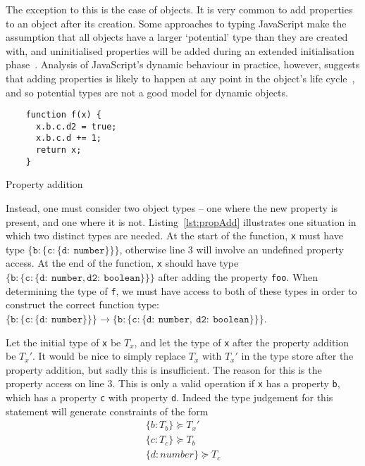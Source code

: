 \documentclass[12pt,a4paper,twoside,openright]{report}
\newcommand*{\js}{\texttt}
\begin{document}
The exception to this is the case of objects. It is very common to add
properties to an object after its creation. Some approaches to typing
JavaScript make the assumption that all objects have a larger `potential' type
than they are created with, and uninitialised properties will be added during
an extended initialisation phase~\cite{anderson05}. Analysis of JavaScript's
dynamic behaviour in practice, however, suggests that adding properties is
likely to happen at any point in the object's life cycle~\cite{JSBehaviour},
and so potential types are not a good model for dynamic objects.
\begin{program}[ht]
  \centering
  \begin{minipage}[b]{0.45\linewidth}
  	\begin{verbatim}
	function f(x) {
	  x.b.c.d2 = true;
	  x.b.c.d += 1;
	  return x;
	}	
  	\end{verbatim}
  	\vspace{23mm}
  \end{minipage}
  \quad
  \begin{minipage}[b]{0.45\linewidth}
  \end{minipage}
  \caption{Property addition}\label{lst:propAdd}
\end{program}

Instead, one must consider two object types -- one where the new property is
present, and one where it is not. Listing~\ref{lst:propAdd} illustrates one
situation in which two distinct types are needed. At the start of the function,
\js{x} must have type $\mathtt{\{b:\{c:\{d:\ number\}\}\}}$, otherwise line 3 will involve
an undefined property access. At the end of the function, \js{x} should
have type $\mathtt{\{b:\{c:\{d:\ number, d2:\ boolean\}\}\}}$ after adding the property
\js{foo}. When determining the type of \js{f}, we must have access to
both of these types in order to construct the correct function type:
$\mathtt{\{b:\{c:\{d:\ number\}\}\} \rightarrow \{b:\{c:\{d:\ number,\ d2:\ boolean\}\}\}}$.

Let the initial type of \js{x} be $T_x$, and let the type of \js{x}
after the property addition be $T_x'$. It would be nice to simply replace $T_x$
with $T_x'$ in the type store after the property addition, but sadly this is
insufficient. The reason for this is the property access on line 3.  This is
only a valid operation if \js{x} has a property \js{b}, which has a
property \js{c} with property \js{d}. Indeed the type judgement for
this statement will generate constraints of the form 
\begin{equation}
  \begin{split}
  \label{eq:barC}
  \{b:T_b\} \succeq T_x' \\
  \{c:T_c\} \succeq T_b \\
  \{d:number\} \succeq T_c \\
\end{split}
\end{equation}
\end{document}
